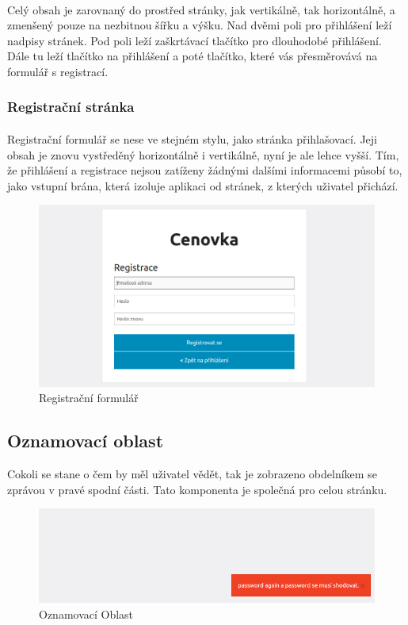 \paragraph{} 
Celý obsah je zarovnaný do prostřed stránky, jak vertikálně, tak horizontálně, a zmenšený pouze na nezbitnou šířku a výšku. Nad dvěmi poli pro přihlášení leží nadpisy stránek. Pod poli leží zaškrtávací tlačítko pro dlouhodobé přihlášení. Dále tu leží tlačítko na přihlášení a poté tlačítko, které vás přesměrovává na formulář s registrací. 
\subsubsection{Registrační stránka}
\paragraph{}
Registrační formulář se nese ve stejném stylu, jako stránka přihlašovací. Jeji obsah je znovu vystředěný horizontálně i vertikálně, nyní je ale lehce vyšší. Tím, že přihlášení a registrace nejsou zatíženy žádnými dalšími informacemi působí to, jako vstupní brána, která izoluje aplikaci od stránek, z kterých uživatel přichází.
\begin{figure}[h]
\centering
\includegraphics[width=1\textwidth]{graphic/register.png}
\caption{Registrační formulář}
\end{figure}

\subsection{Oznamovací oblast}
Cokoli se stane o čem by měl uživatel vědět, tak je zobrazeno obdelníkem se zprávou v pravé spodní části. Tato komponenta je společná pro celou stránku. 
\begin{figure}[h]
\centering
\includegraphics[width=1\textwidth]{graphic/alert.png}
\caption{Oznamovací Oblast}
\end{figure}
